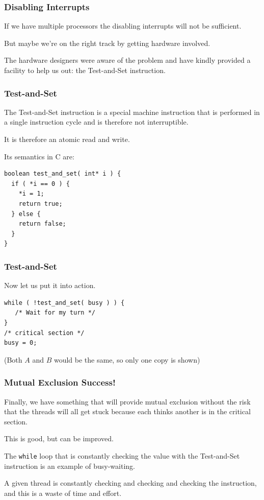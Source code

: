\begin{frame}
	\frametitle{Disabling Interrupts}

	If we have multiple processors the disabling interrupts will not be sufficient.

	But maybe we're on the right track by getting hardware involved.


	The hardware designers were aware of the problem and have kindly provided a facility to help us out: the \alert{Test-and-Set} instruction.


\end{frame}

\begin{frame}[fragile]
	\frametitle{Test-and-Set}

	The Test-and-Set instruction is a special machine instruction that is performed in a single instruction cycle and is therefore not interruptible.

	It is therefore an atomic read and write.

	Its semantics in C are:

	\begin{verbatim}
boolean test_and_set( int* i ) {
  if ( *i == 0 ) {
    *i = 1;
    return true;
  } else {
    return false;
  }
}
\end{verbatim}

\end{frame}

\begin{frame}[fragile]
	\frametitle{Test-and-Set}

	Now let us put it into action.

	\begin{verbatim}
while ( !test_and_set( busy ) ) {
   /* Wait for my turn */
}
/* critical section */
busy = 0;
\end{verbatim}


	(Both $A$ and $B$ would be the same, so only one copy is shown)


\end{frame}

\begin{frame}
	\frametitle{Mutual Exclusion Success!}

	Finally, we have something that will provide mutual exclusion without the risk that the threads will all get stuck because each thinks another is in the critical section.

	This is good, but can be improved.

	The \texttt{while} loop that is constantly checking the value with the Test-and-Set instruction is an example of \alert{busy-waiting}.

	A given thread is constantly checking and checking and checking the instruction, and this is a waste of time and effort.

\end{frame}

